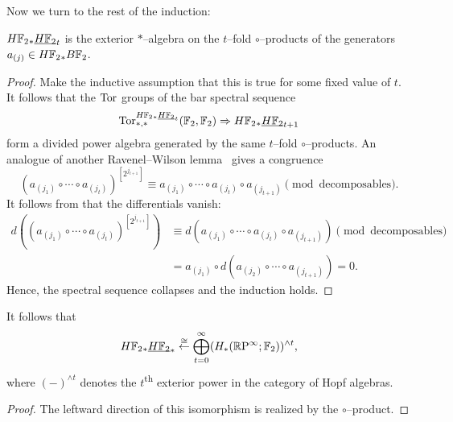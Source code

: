 Now we turn to the rest of the induction:
\begin{theorem}
$H\mathbb F_2{}_* \underline{\smash{H\mathbb F_2}}_{t}$ is the exterior $\ast$--algebra on the $t$--fold $\circ$--products of the generators $a_{(j)} \in H\mathbb F_2{}_* B\mathbb F_2$.
\end{theorem}
\begin{proof}
Make the inductive assumption that this is true for some fixed value of $t$.  It follows that the $\operatorname{Tor}$ groups of the bar spectral sequence \[\operatorname{Tor}^{H\mathbb F_2{}_* \underline{\smash{H\mathbb F_2}}_{t}}_{*, *}(\mathbb F_2, \mathbb F_2) \Rightarrow H\mathbb F_2{}_* \underline{\smash{H\mathbb F_2}}_{t+1}\] form a divided power algebra generated by the same $t$--fold $\circ$--products.  An analogue of another Ravenel--Wilson lemma~\cite[Lemma 9.5]{RavenelWilsonKthyOfEMSpaces} gives a congruence \[(a_{(j_1)} \circ \cdots \circ a_{(j_t)})^{[2^{j_{t+1}}]} \equiv a_{(j_1)} \circ \cdots \circ a_{(j_t)} \circ a_{(j_{t+1})} \pmod{\text{decomposables}}.\]  It follows from  that the differentials vanish:
\begin{align*}
d((a_{(j_1)} \circ \cdots \circ a_{(j_t)})^{[2^{j_{t+1}}]}) & \equiv d(a_{(j_1)} \circ \cdots \circ a_{(j_t)} \circ a_{(j_{t+1})}) \pmod{\text{decomposables}} \\
& = a_{(j_1)} \circ d(a_{(j_2)} \circ \cdots \circ a_{(j_{t+1})}) = 0.
\end{align*}
Hence, the spectral sequence collapses and the induction holds.
\end{proof}

\begin{corollary}
It follows that \[H\mathbb F_2{}_* \underline{\smash{H\mathbb F_2}}_{*} \stackrel\cong\leftarrow \bigoplus_{t=0}^\infty (H_*(\mathbb R\mathrm P^\infty; \mathbb F_2))^{\wedge t},\] where $(-)^{\wedge t}$ denotes the $t$\textsuperscript{th} exterior power in the category of Hopf algebras.
\end{corollary}
\begin{proof}
The leftward direction of this isomorphism is realized by the $\circ$--product.
\end{proof}

